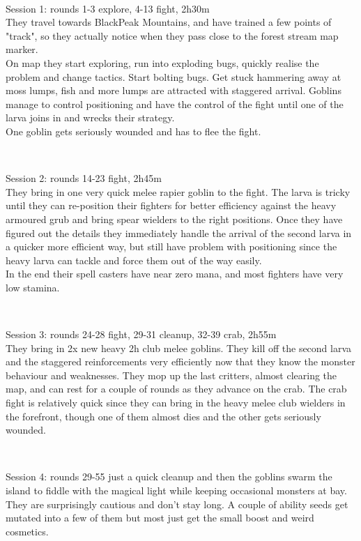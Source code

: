 \

Session 1: rounds 1-3 explore, 4-13 fight, 2h30m\\
They travel towards BlackPeak Mountains, and have trained a few points of "track", so they actually notice when they pass close to the forest stream map marker.\\
On map they start exploring, run into exploding bugs, quickly realise the problem and change tactics. Start bolting bugs. Get stuck hammering away at moss lumps, fish and more lumps are attracted with staggered arrival. Goblins manage to control positioning and have the control of the fight until one of the larva joins in and wrecks their strategy.\\
One goblin gets seriously wounded and has to flee the fight.

\

Session 2: rounds 14-23 fight, 2h45m\\
They bring in one very quick melee rapier goblin to the fight. The larva is tricky until they can re-position their fighters for better efficiency against the heavy armoured grub and bring spear wielders to the right positions. Once they have figured out the details they immediately handle the arrival of the second larva in a quicker more efficient way, but still have problem with positioning since the heavy larva can tackle and force them out of the way easily.\\
In the end their spell casters have near zero mana, and most fighters have very low stamina.

\

Session 3: rounds 24-28 fight, 29-31 cleanup, 32-39 crab, 2h55m\\
They bring in 2x new heavy 2h club melee goblins. They kill off the second larva and the staggered reinforcements very efficiently now that they know the monster behaviour and weaknesses. They mop up the last critters, almost clearing the map, and can rest for a couple of rounds as they advance on the crab. The crab fight is relatively quick since they can bring in the heavy melee club wielders in the forefront, though one of them almost dies and the other gets seriously wounded.

\

Session 4: rounds 29-55 just a quick cleanup and then the goblins swarm the island to fiddle with the magical light while keeping occasional monsters at bay. They are surprisingly cautious and don't stay long. A couple of ability seeds get mutated into a few of them but most just get the small boost and weird cosmetics.









